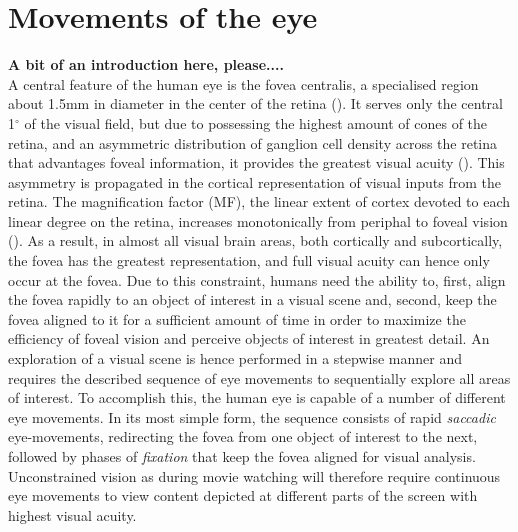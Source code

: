 \documentclass[a4paper, 12pt]{scrreprt}
\begin{document}
\section{Movements of the eye}\label{section:eyemoves}

\textbf{A bit of an introduction here, please....}\\ A central feature of the human eye is the fovea centralis, a specialised region about 1.5mm in diameter in the center of the retina (\cite{benninghof2004anat}). It serves only the central 1$^\circ$ of the visual field, but due to possessing the highest amount of cones of the retina, and an asymmetric distribution of ganglion cell density across the retina that advantages foveal information, it provides the greatest visual acuity (\cite{perry1986ganglion}). This asymmetry is propagated in the cortical representation of visual inputs from the retina. The magnification factor (MF), the linear extent of cortex devoted to each linear degree on the retina, increases monotonically from periphal to foveal vision (\cite{daniel1961representation}). As a result, in almost all visual brain areas, both cortically and subcortically, the fovea has the greatest representation, and full visual acuity can hence only occur at the fovea. Due to this constraint, humans need the ability to, first, align the fovea rapidly to an object of interest in a visual scene and, second, keep the fovea aligned to it for a sufficient amount of time in order to maximize the efficiency of foveal vision and perceive objects of interest in greatest detail. An exploration of a visual scene is hence performed in a stepwise manner and requires the described sequence of eye movements to sequentially explore all areas of interest. To accomplish this, the human eye is capable of a number of different eye movements. In its most simple form, the sequence consists of rapid \textit{saccadic} eye-movements, redirecting the fovea from one object of interest to the next, followed by phases of \textit{fixation} that keep the fovea aligned for visual analysis. Unconstrained vision as during movie watching will therefore require continuous eye movements to view content depicted at different parts of the screen with highest visual acuity.\newline
\end{document}
